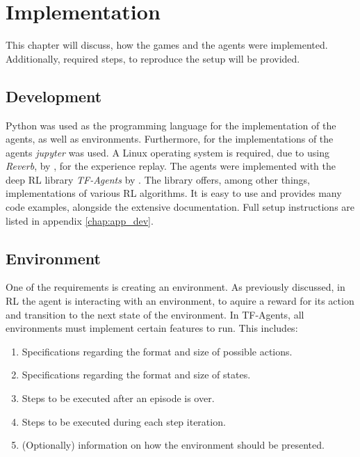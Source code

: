 \chapter{Implementation}
\label{chap:implementation}





This chapter will discuss, how the games and the agents were implemented. Additionally, required steps, to reproduce the setup will be provided. 


\section{Development}
\label{sec:imp_development}
Python was used as the programming language for the implementation of the agents, as well as environments. Furthermore, for the implementations of the agents \textit{jupyter} was used. A Linux operating system is required, due to using \textit{Reverb}, by , for the experience replay. The agents were implemented with the deep RL library \textit{TF-Agents} by . The library offers, among other things, implementations of various RL algorithms. It is easy to use and provides many code examples, alongside the extensive documentation. Full setup instructions are listed in appendix \ref{chap:app_dev}.


\section{Environment}
\label{sec:environment}
One of the requirements is creating an environment. As previously discussed, in RL the agent is interacting with an environment, to aquire a reward for its action and transition to the next state of the environment. In TF-Agents, all environments must implement certain features to run. This includes:

\begin{enumerate}

	\item{Specifications regarding the format and size of possible actions.}
	\item{Specifications regarding the format and size of states.}
	\item{Steps to be executed after an episode is over.}
	\item{Steps to be executed during each step iteration.}
	\item{(Optionally) information on how the environment should be presented. }

\end{enumerate}


